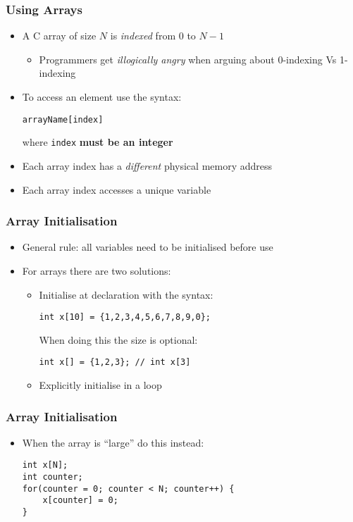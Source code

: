 \documentclass[14pt]{beamer}
\begin{document}
\begin{frame}[fragile]
\frametitle{Using Arrays}
\begin{itemize}
\item A C array of size $N$ is \textit{indexed} from $0$ to $N-1$
	\begin{itemize}
		\item Programmers get \textit{illogically angry} when arguing about 0-indexing Vs 1-indexing
	\end{itemize}
\item To access an element use the syntax:\\
\begin{lstlisting}[style=CStyle]
arrayName[index]
\end{lstlisting}
where \texttt{index} \textbf{must be an integer}
\item Each array index has a \textit{different} physical memory address
\item Each array index accesses a unique variable
\end{itemize}
\end{frame}

\begin{frame}[fragile]
\frametitle{Array Initialisation}
\begin{itemize}
\item General rule: all variables need to be initialised before use
\item For arrays there are two solutions:
	\begin{itemize}
		\item Initialise at declaration with the syntax:
		\begin{lstlisting}[style=CStyle]
		int x[10] = {1,2,3,4,5,6,7,8,9,0};
		\end{lstlisting}
		When doing this the size is optional:
		\begin{lstlisting}[style=CStyle]
		int x[] = {1,2,3}; // int x[3]
		\end{lstlisting}
		\item Explicitly initialise in a loop
	\end{itemize}
\end{itemize}
\end{frame}

\begin{frame}[fragile]
\frametitle{Array Initialisation}
\begin{itemize}
\item When the array is ``large'' do this instead:
\begin{lstlisting}[style=CStyle]
int x[N];
int counter;
for(counter = 0; counter < N; counter++) {
	x[counter] = 0;
}
\end{lstlisting}
\end{itemize}
\end{frame}
\end{document}
